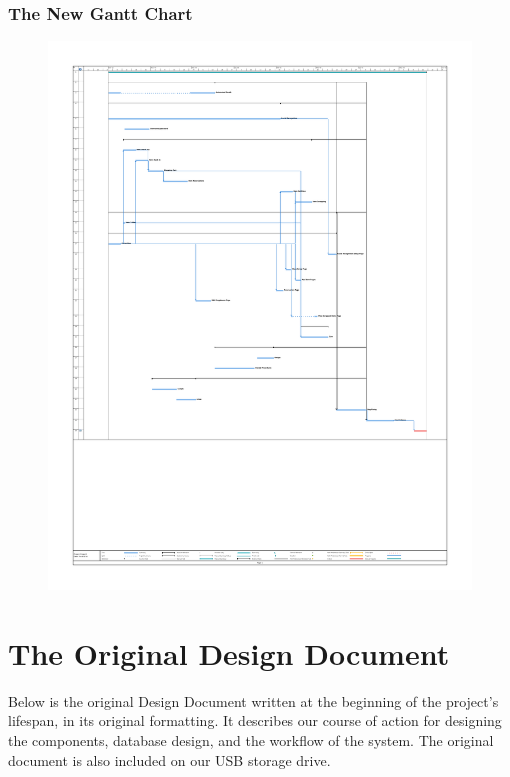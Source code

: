 \documentclass[10pt, onecolumn, twoside, peerreview]{IEEEtran}
\begin{document}
\subsubsection{The New Gantt Chart}
\begin{figure}[H]
  \includegraphics[width=\textwidth]{newgantt}
\end{figure}
\clearpage

\section{The Original Design Document}

Below is the original Design Document written at the beginning of the project's lifespan, in its original formatting.
It describes our course of action for designing the components, database design, and the workflow of the system. The
original document is also included on our USB storage drive.


\end{document}
